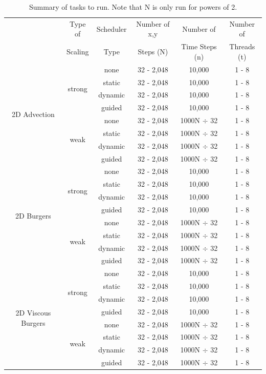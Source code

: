 \documentclass{article}
\begin{document}
\begin{table}[h]
\begin{center}
\begin{tabular}{ |c|c|c|c|c|c| } 
\hline
 & Type of  & Scheduler & Number of x,y & Number of & Number of \\
 & Scaling  & Type & Steps (N) & Time Steps (n) &  Threads (t) \\

\hline
\multirow{8}{4em}{2D Advection} & \multirow{4}{4em}{strong}& none & 32 - 2,048 & 10,000 & 1 - 8 \\ 
& & static & 32 - 2,048 & 10,000 & 1 - 8 \\
& & dynamic & 32 - 2,048 & 10,000 & 1 - 8 \\ 
&  & guided & 32 - 2,048 & 10,000 & 1 - 8 \\ 
& \multirow{4}{4em}{weak}& none & 32 - 2,048 & 1000N $\div$ 32 & 1 - 8 \\ 
& & static & 32 - 2,048 & 1000N $\div$ 32 & 1 - 8 \\
& & dynamic & 32 - 2,048 & 1000N $\div$ 32 & 1 - 8 \\ 
&  & guided & 32 - 2,048 & 1000N $\div$ 32 & 1 - 8 \\ 
\hline
\multirow{8}{4em}{2D Burgers} & \multirow{4}{4em}{strong}& none & 32 - 2,048 & 10,000 & 1 - 8 \\ 
& & static & 32 - 2,048 & 10,000 & 1 - 8 \\
& & dynamic & 32 - 2,048 & 10,000 & 1 - 8 \\ 
&  & guided & 32 - 2,048 & 10,000 & 1 - 8 \\ 
& \multirow{4}{4em}{weak}& none & 32 - 2,048 & 1000N $\div$ 32 & 1 - 8 \\ 
& & static & 32 - 2,048 & 1000N $\div$ 32 & 1 - 8 \\
& & dynamic & 32 - 2,048 & 1000N $\div$ 32 & 1 - 8 \\ 
&  & guided & 32 - 2,048 & 1000N $\div$ 32 & 1 - 8 \\ 
\hline
\multirow{8}{4em}{2D Viscous Burgers} & \multirow{4}{4em}{strong}& none & 32 - 2,048 & 10,000 & 1 - 8 \\ 
& & static & 32 - 2,048 & 10,000 & 1 - 8 \\
& & dynamic & 32 - 2,048 & 10,000 & 1 - 8 \\ 
&  & guided & 32 - 2,048 & 10,000 & 1 - 8 \\ 
& \multirow{4}{4em}{weak}& none & 32 - 2,048 & 1000N $\div$ 32 & 1 - 8 \\ 
& & static & 32 - 2,048 & 1000N $\div$ 32 & 1 - 8 \\
& & dynamic & 32 - 2,048 & 1000N $\div$ 32 & 1 - 8 \\ 
&  & guided & 32 - 2,048 & 1000N $\div$ 32 & 1 - 8 \\ 
\hline
\end{tabular}
\end{center}
\caption{Summary of tasks to run. Note that N is only run for powers of 2.}
\label{Table_Timing_Summary}
\end{table}
\end{document}
